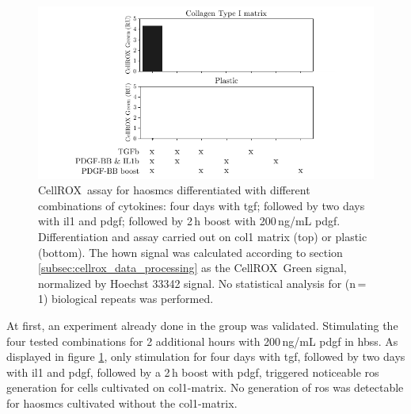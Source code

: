     \begin{figure}[h!]
    \capstart
        \centering
    	\includegraphics{Abbildung/CellROX_initial_cond.pdf}

    	\begin{minipage}{\captionwidth}
    		\caption[repeat_Lisa]{ \newline CellROX\texttrademark~assay for \acp{haosmc} differentiated with different combinations of cytokines: four days with \ac{tgf}; followed by two days with \ac{il1} and \ac{pdgf}; followed by 2\,h boost with 200\,ng/mL \ac{pdgf}. Differentiation and assay carried out on \ac{col1} matrix (top) or plastic (bottom). The hown signal was calculated according to section \ref{subsec:cellrox_data_processing} as the CellROX\texttrademark~Green signal, normalized by Hoechst 33342 signal. No statistical analysis for (n\,=\,1) biological repeats was performed. }
    		\label{fig:cellrox_8con}
    	\end{minipage}
    \end{figure}

    At first, an experiment already done in the group was validated. Stimulating the four tested combinations for 2 additional hours with 200\,ng/mL \ac{pdgf} in \ac{hbss}. As displayed in figure \ref{fig:cellrox_8con}, only stimulation for four days with \ac{tgf}, followed by two days with \ac{il1} and \ac{pdgf}, followed by a 2\,h boost with \ac{pdgf}, triggered noticeable \ac{ros} generation for cells cultivated on \ac{col1}-matrix. No generation of \ac{ros} was detectable for \acp{haosmc} cultivated without the \ac{col1}-matrix.

